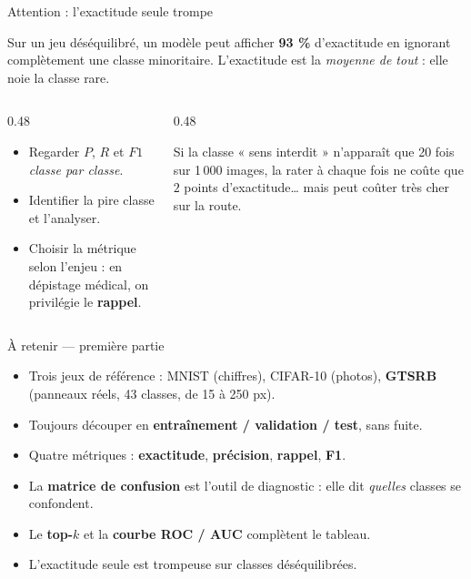 \begin{frame}{Attention : l'exactitude seule trompe}
\begin{wbox}
Sur un jeu déséquilibré, un modèle peut afficher \textbf{93 \%} d'exactitude en
ignorant complètement une classe minoritaire. L'exactitude est la \emph{moyenne
de tout} : elle noie la classe rare.
\end{wbox}
\vspace{1mm}
\begin{columns}[t]
\begin{column}{0.48\textwidth}
\begin{kbox}
\begin{itemize}
  \item Regarder $P$, $R$ et $F1$ \emph{classe par classe}.
  \item Identifier la pire classe et l'analyser.
  \item Choisir la métrique selon l'enjeu : en dépistage médical, on privilégie
  le \textbf{rappel}.
\end{itemize}
\end{kbox}
\end{column}
\begin{column}{0.48\textwidth}
\begin{ebox}[Exemple]
Si la classe « sens interdit » n'apparaît que 20 fois sur 1\,000 images, la rater à
chaque fois ne coûte que $2$ points d'exactitude\dots{} mais peut coûter très cher
sur la route.
\end{ebox}
\end{column}
\end{columns}
\end{frame}

\begin{frame}{À retenir --- première partie}
\begin{kbox}
\begin{itemize}
  \item Trois jeux de référence : MNIST (chiffres), CIFAR-10 (photos), \textbf{GTSRB}
  (panneaux réels, 43 classes, de 15 à 250 px).
  \item Toujours découper en \textbf{entraînement / validation / test}, sans fuite.
  \item Quatre métriques : \textbf{exactitude}, \textbf{précision}, \textbf{rappel},
  \textbf{F1}.
  \item La \textbf{matrice de confusion} est l'outil de diagnostic : elle dit
  \emph{quelles} classes se confondent.
  \item Le \textbf{top-$k$} et la \textbf{courbe ROC / AUC} complètent le tableau.
  \item L'exactitude seule est trompeuse sur classes déséquilibrées.
\end{itemize}
\end{kbox}
\end{frame}
